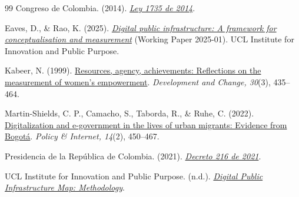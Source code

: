 \documentclass[12pt]{article}
\begin{document}
\begin{thebibliography}{99}
Congreso de Colombia. (2014). \href{https://normograma.dian.gov.co/dian/compilacion/docs/ley_1735_2014.htm}{\emph{Ley 1735 de 2014}}.

Eaves, D., \& Rao, K. (2025). \href{https://discovery.ucl.ac.uk/id/eprint/10210968/}{\emph{Digital public infrastructure: A framework for conceptualisation and measurement}} (Working Paper 2025-01). UCL Institute for Innovation and Public Purpose.

Kabeer, N. (1999). \href{https://doi.org/10.1111/1467-7660.00125}{Resources, agency, achievements: Reflections on the measurement of women's empowerment}. \emph{Development and Change, 30}(3), 435--464.

Martin-Shields, C. P., Camacho, S., Taborda, R., \& Ruhe, C. (2022). \href{https://doi.org/10.1002/poi3.280}{Digitalization and e-government in the lives of urban migrants: Evidence from Bogotá}. \emph{Policy \& Internet, 14}(2), 450--467.

Presidencia de la República de Colombia. (2021). \href{https://www.funcionpublica.gov.co/eva/gestornormativo/norma.php?i=159606}{\emph{Decreto 216 de 2021}}.

UCL Institute for Innovation and Public Purpose. (n.d.). \href{https://dpimap.org/methodology/}{\emph{Digital Public Infrastructure Map: Methodology}}.
\end{thebibliography}

\end{document}
